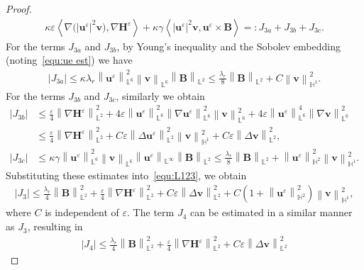 \documentclass[11pt, reqno]{amsart}
\theoremstyle{definition}
\theoremstyle{remark}
\numberwithin{equation}{section}
\newcommand{\bff}{\boldsymbol}
\newcommand{\bb}{\mathbb}
\newcommand{\norm}[2]{\left\|{#1}\right\|_{#2}}
\newcommand{\inpro}[2]{\left\langle#1,#2\right\rangle}
\newcommand{\abs}[1]{\left|{#1}\right|}
\begin{document}
\begin{proof}
\begin{align}
	 \kappa \varepsilon \inpro{\nabla\big(|\bff{u}^\varepsilon|^2 \bff{v}\big)}{\nabla \bff{H}^\varepsilon}
	 +
	 \kappa \gamma \inpro{|\bff{u}^\varepsilon|^2 \bff{v}}{\bff{u}^\varepsilon\times \bff{B}}
	 =: J_{3a}+J_{3b}+J_{3c}.
\end{align}
For the terms $J_{3a}$ and $J_{3b}$, by Young's inequality and the Sobolev embedding (noting~\eqref{equ:ue est}) we have
\begin{align*}
	\abs{J_{3a}} 
	\leq
	\kappa \lambda_r \norm{\bff{u}^\varepsilon}{\bb{L}^6}^2 \norm{\bff{v}}{\bb{L}^6} \norm{\bff{B}}{\bb{L}^2}
	\leq
	\frac{\lambda_r}{8} \norm{\bff{B}}{\bb{L}^2}
	+
	C \norm{\bff{v}}{\bb{H}^1}^2.
\end{align*}
For the terms $J_{3b}$ and $J_{3c}$, similarly we obtain
\begin{align*}
	\abs{J_{3b}}
	&\leq
	\frac{\varepsilon}{4} \norm{\nabla \bff{H}^\varepsilon}{\bb{L}^2}^2
	+
	4\varepsilon \norm{\bff{u}^\varepsilon}{\bb{L}^6}^2 \norm{\nabla \bff{u}^\varepsilon}{\bb{L}^6}^2 \norm{\bff{v}}{\bb{L}^6}^2
	+
	4 \varepsilon \norm{\bff{u}^\varepsilon}{\bb{L}^6}^4 \norm{\nabla \bff{v}}{\bb{L}^6}^2
	\\
	&\leq
	\frac{\varepsilon}{4} \norm{\nabla \bff{H}^\varepsilon}{\bb{L}^2}^2
	+
	C\varepsilon \norm{\Delta \bff{u}^\varepsilon}{\bb{L}^2}^2 \norm{\bff{v}}{\bb{H}^1}^2
	+
	C\varepsilon \norm{\Delta \bff{v}}{\bb{L}^2}^2,
	\\
	\abs{J_{3c}}
	&\leq
	\kappa \gamma \norm{\bff{u}^\varepsilon}{\bb{L}^6}^2 \norm{\bff{v}}{\bb{L}^6}
	\norm{\bff{u}^\varepsilon}{\bb{L}^\infty} \norm{\bff{B}}{\bb{L}^2}
	\leq
	\frac{\lambda_r}{8} \norm{\bff{B}}{\bb{L}^2}
	+
	\norm{\bff{u}^\varepsilon}{\bb{H}^2}^2 \norm{\bff{v}}{\bb{H}^1}^2.
\end{align*}
Substituting these estimates into~\eqref{equ:L123}, we obtain
\begin{align}\label{equ:J3}
	\abs{J_3}
	\leq
	\frac{\lambda_r}{4} \norm{\bff{B}}{\bb{L}^2}^2
	+
	\frac{\varepsilon}{4} \norm{\nabla \bff{H}^\varepsilon}{\bb{L}^2}^2
	+
	C\varepsilon \norm{\Delta \bff{v}}{\bb{L}^2}^2
	+
	C\left(1+\norm{\bff{u}^\varepsilon}{\bb{H}^2}^2 \right)\norm{\bff{v}}{\bb{H}^1}^2,
\end{align}
where $C$ is independent of $\varepsilon$.
The term $J_4$ can be estimated in a similar manner as $J_3$, resulting in
\begin{align}\label{equ:J4}
	\abs{J_4}
	\leq
	\frac{\lambda_r}{4} \norm{\bff{B}}{\bb{L}^2}^2
	+
	\frac{\varepsilon}{4} \norm{\nabla \bff{H}^\varepsilon}{\bb{L}^2}^2
	+
	C\varepsilon \norm{\Delta \bff{v}}{\bb{L}^2}^2

\end{align}
\end{proof}
\end{document}
